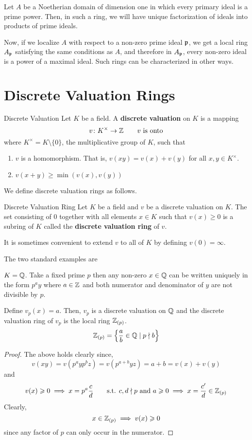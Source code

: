 Let \(A\) be a Noetherian domain of dimension one in which every primary
ideal is a prime power.
Then, in such a ring, we will have unique factorization of ideals into
products of prime ideals.

Now, if we localize \(A\) with respect to a non-zero prime ideal \(\mathfrak{p}\),
we get a local ring \(A_{\mathfrak{p}}\) satisfying the same conditions as \(A\),
and therefore in \(A_{\mathfrak{p}}\), every non-zero ideal is a power of a
maximal ideal.
Such rings can be characterized in other ways.


\section{Discrete Valuation Rings}

\begin{definition}{Discrete Valuation}{}{}
	Let \(K\) be a field.
	A \textbf{discrete valuation} on \(K\) is a mapping
	\[
		v \colon K^{\times} \to \ZZ  \quad\quad v \text{ is onto}
	\]
	where \(K^{\times} = K \setminus \{0\}\), the multiplicative group
	of \(K\), such that
	\begin{enumerate}
		\item \(v\) is a homomorphism.
		That is, \(v(xy) = v(x) + v(y)\) for all \(x, y \in K^{\times}\).
		\item \(v(x + y) \geq \min(v(x), v(y))\)

	\end{enumerate}
\end{definition}

We define discrete valuation rings as follows.
\begin{definition}{Discrete Valuation Ring}{}{}
	Let \(K\) be a field and \(v\) be a discrete valuation on \(K\).
	The set consisting of \(0\) together with all elements \(x \in K\)
	such that \(v(x) \geq 0\) is a subring of \(K\) called the
	\textbf{discrete valuation ring} of \(v\).

	It is sometimes convenient to extend \(v\) to all of \(K\) by
	defining \(v(0) = \infty\).
\end{definition}

The two standard examples are
\begin{example}{}{}
	\(K = \QQ\).
	Take a fixed prime \(p\) then any non-zero \(x \in \QQ\) can be
	written uniquely in the form \(p^a y\) where \(a \in \ZZ\) and
	both numerator and denominator of \(y\) are not divisible by \(p\).

	Define \(v_p(x) = a\).
	Then, \(v_p\) is a discrete valuation on \(\QQ\) and the discrete
	valuation ring of \(v_p\) is the local ring \(\ZZ_{(p)}\).
	\[
		\ZZ_{(p)} = \left\{ \frac{a}{b} \in \QQ \mid p \nmid b \right\}
	\]
\end{example}
\begin{proof}
	The above holds clearly since,
	\[
		v(xy) = v(p^a y p^b z) = v(p^{a+b} yz) = a + b = v(x) + v(y)
	\]
	and
	\[
		v(x) \geq 0 \implies x = p^a \frac{c}{d} \quad\quad
		\text{s.t. } c, d \nmid p \AND a \geq 0
		\implies x = \frac{c'}{d} \in \ZZ_{(p)}
	\]
	Clearly,
	\[
		x \in \ZZ_{(p)} \implies v(x) \geq 0
	\]
	since any factor of \(p\) can only occur in the numerator.
\end{proof}

